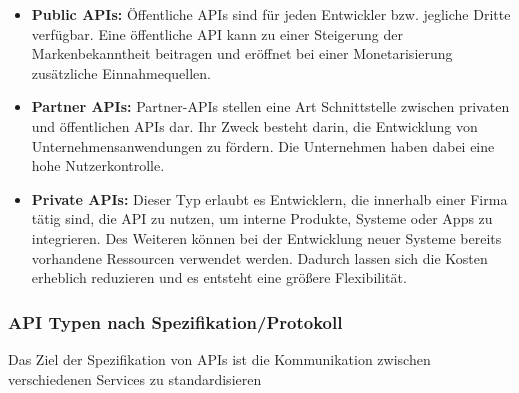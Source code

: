 \begin{itemize}
	\item \textbf{Public APIs:} Öffentliche APIs sind für jeden Entwickler bzw. jegliche Dritte verfügbar. Eine öffentliche API kann zu einer Steigerung der Markenbekanntheit beitragen und eröffnet bei einer Monetarisierung zusätzliche Einnahmequellen.\citep{apistrategyguide}
	\item \textbf{Partner APIs:} Partner-APIs stellen eine Art Schnittstelle zwischen privaten und öffentlichen APIs dar. Ihr Zweck besteht darin, die Entwicklung von Unternehmensanwendungen zu fördern. Die Unternehmen haben dabei eine hohe Nutzerkontrolle.\citep{apistrategyguide}
	\item \textbf{Private APIs:} Dieser Typ erlaubt es Entwicklern, die innerhalb einer Firma tätig sind, die API zu nutzen, um interne Produkte, Systeme oder Apps zu integrieren. Des Weiteren können bei der Entwicklung neuer Systeme bereits vorhandene Ressourcen verwendet werden. Dadurch lassen sich die Kosten erheblich reduzieren und es entsteht eine größere Flexibilität. \citep{apistrategyguide}
\end{itemize}
\newpage
\subsubsection{API Typen nach Spezifikation/Protokoll} %
\label{sec:apitypenspezifikation}
Das Ziel der Spezifikation von APIs ist die Kommunikation zwischen verschiedenen Services zu standardisieren

